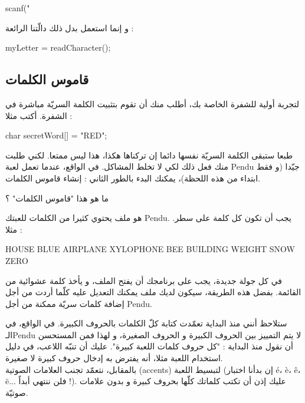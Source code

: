\begin{Csource}
scanf("%
\end{Csource}

و إنما استعمل بدل ذلك دالّتنا الرائعة :

\begin{Csource}
myLetter = readCharacter();
\end{Csource}

\subsection{قاموس الكلمات}
لتجربة أولية للشفرة الخاصة بك، أطلب منك أن تقوم بتثبيت الكلمة السريّة مباشرة في الشفرة. أكتب مثلا :

\begin{Csource}
char secretWord[] = "RED";
\end{Csource}

طبعا ستبقى الكلمة السريّة نفسها دائما إن تركناها هكذا، هذا ليس ممتعا. لكني طلبت منك فعل ذلك لكي لا تخلط المشاكل. في الواقع، عندما تعمل لعبة
\textenglish{Pendu}
جيّدا (و فقط ابتداء من هذه اللحظة)، يمكنك البدء بالطور الثاني : إنشاء قاموس الكلمات.

\begin{question}
ما هو هذا "قاموس الكلمات" ؟
\end{question}

هو ملف يحتوي كثيرا من الكلمات للعبتك
\textenglish{Pendu}.
يجب أن تكون كل كلمة على سطر. مثلا :

\begin{Console}
HOUSE
BLUE
AIRPLANE
XYLOPHONE
BEE
BUILDING
WEIGHT
SNOW
ZERO
\end{Console}

في كل جولة جديدة، يجب على برنامجك أن يفتح الملف، و يأخذ كلمة عشوائية من القائمة. بفضل هذه الطريقة، سيكون لديك ملف يمكنك التعديل عليه كلّما أردت من أجل إضافة كلمات سريّة ممكنة من أجل
\textenglish{Pendu}.

\begin{information}
ستلاحظ أنني منذ البداية تعمّدت كتابة كلّ الكلمات بالحروف الكبيرة. في الواقع، في الـ\textenglish{Pendu}
لا يتم التمييز بين الحروف الكبيرة و الحروف الصغيرة، و لهذا فمن المستحسن أن نقول منذ البداية : "كل حروف كلمات اللعبة كبيرة". عليك أن تنبّه اللاعب، في دليل استخدام اللعبة مثلا، أنه يفترض به إدخال حروف كبيرة لا صغيرة.\\
بالمقابل، نتعمّد تجنب العلامات الصوتية
(\textenglish{accents})
لتبسيط اللعبة (إن بدأنا اختبار \textenglish{é}، \textenglish{è}، \textenglish{ê}، \textenglish{ë}... فلن ننتهي أبداً !). عليك إذن أن تكتب كلماتك كلّها بحروف كبيرة و بدون علامات صوتيّة.
\end{information}

